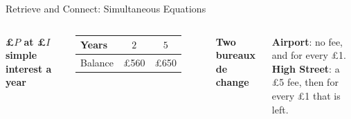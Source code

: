 \documentclass{beamer}
\newcommand{\receipt}[4]{%
  \draw[fill=yellow!4, draw=black!60]
    (#1,0) -- ({#1+1.95},0) -- ({#1+1.95},-1.3)
    \foreach \i in {1,...,6} { -- ({#1+1.95-0.325*\i+0.1625},-1.38) -- ({#1+1.95-0.325*\i},-1.3) }
    -- cycle;
  \node[anchor=west] at ({#1+0.1},-0.25) {#2};
  \node[anchor=west] at ({#1+0.1},-0.58) {#3};
  \draw[black!50, dashed] ({#1+0.1},-0.8) -- ({#1+1.85},-0.8);
  \node[anchor=west, font=\scriptsize\bfseries] at ({#1+0.1},-1.05) {Total};
  \node[anchor=east] at ({#1+1.85},-1.05) {#4};
}
\begin{document}
\begin{frame}[t]{Retrieve and Connect: Simultaneous Equations}
\begin{columns}[T,onlytextwidth]

\vspace{-0.4em}

\vspace{0.8em}
{\scriptsize\bfseries \pounds$P$ at \pounds$I$ simple interest a year}\par
\vspace{0.2em}
{\scriptsize
\renewcommand{\arraystretch}{1.3}
\begin{tabular}{l|c|c}
  Years   & $2$        & $5$\\ \hline
  Balance & \pounds560 & \pounds650
\end{tabular}}

\vspace{0.9em}
{\scriptsize\bfseries Two bureaux de change}\par
\vspace{0.2em}
\parbox{\linewidth}{\raggedright\scriptsize
  \textbf{Airport}: no fee, and  for every \pounds1.\\[2pt]
  \textbf{High Street}: a \pounds5 fee, then  for every \pounds1 that is left.}


\end{columns}
\end{frame}
\end{document}
